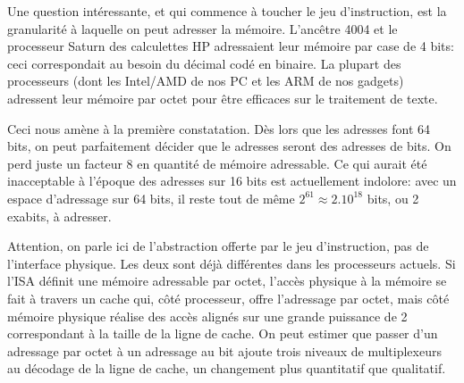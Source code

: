 \documentclass[architecture]{compas2018}
\begin{document}
\iffalse %
La croissance du bus de données a suivi avec du retard, pour plusieurs raisons.
La première est que la loi de Moore doit aussi fournir assez de transistors au processeur pour calculer sur des données de plus en plus grandes.
Mais la complexité des principales opérations d'un processeur travaillant sur $n$ bits est en $n$, en $n\log n$ ou au pire en $n^2$: si l'on a pu être à l'étroit jusque dans les années 90 pour construire un processeur qui peut calculer sur des adresses mémoires, ce n'est plus le cas depuis.
La seconde raison est que les ordinateurs servent beaucoup à travailler sur du texte, donc des octets.
On a donc vu des processeurs très populaires 8/16 bits, c'est à dire $w_d=8$ et  $w_a = 16$: les z80, 6502, 8088; des processeurs 16/32 bits (68000, 80286 à 486); et même une variante 8/32 bits, le 68008. Puis l'industrie a convergé vers 32/32 avec l'arrivée des processeurs RISC  (SPARC,  ARM et Power)  puis et 64/64 avec AMD64 et ARM64.
Ainsi,  
De nos jours, les processeurs ont des registres de plusieurs centaines de bits (AMD64 SSE* puis AVX*, ARM Neon), encore une fois parce que la loi de Moore le permet.
Mais ces registres sont des vecteurs de données d'au plus 64 bits.
\fi



Une question intéressante, et qui commence à toucher le jeu d'instruction, est  la granularité à laquelle on peut adresser la mémoire.
L'ancêtre 4004 et le processeur Saturn des calculettes HP adressaient leur mémoire par case de 4 bits: ceci correspondait au besoin du décimal codé en binaire.
La plupart des processeurs (dont les Intel/AMD de nos PC et les ARM de nos gadgets) adressent leur mémoire par octet pour être efficaces sur le traitement de texte.

Ceci nous amène à la première constatation. Dès lors que les adresses font 64 bits, on peut parfaitement décider  que le adresses seront des adresses de bits.
On perd juste un facteur 8 en quantité de mémoire adressable.
Ce qui aurait été inacceptable à l'époque des adresses sur 16 bits est actuellement indolore: avec un espace d'adressage sur 64 bits, il reste tout de même $2^{61}\approx 2.10^{18}$ bits, ou 2 exabits, à adresser.


Attention, on parle ici de l'abstraction offerte par le jeu d'instruction, pas de l'interface physique.
Les deux sont déjà différentes dans les processeurs actuels.
Si l'ISA définit une mémoire adressable par octet, l'accès physique à la mémoire se fait à travers un cache qui, côté processeur, offre l'adressage par octet, mais côté mémoire physique  réalise des accès alignés sur une grande puissance de 2 correspondant à la taille de la ligne de cache.
 On peut estimer que passer d'un adressage par octet à un adressage au bit ajoute trois niveaux de multiplexeurs au décodage de la ligne de cache, un changement plus quantitatif que qualitatif.
\end{document}
